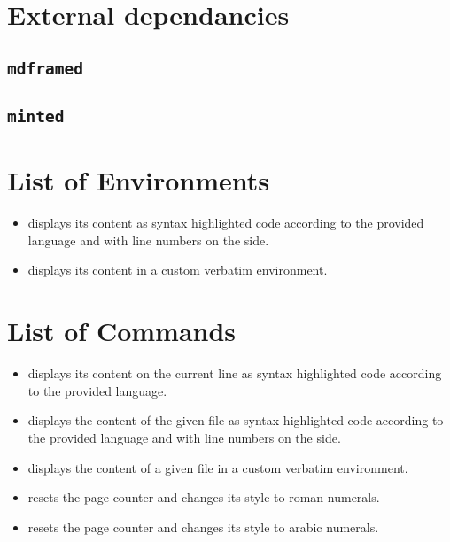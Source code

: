 \documentclass{report}
\begin{document}
\section{External dependancies}



\subsection{\texttt{mdframed}}

\subsection{\texttt{minted}}


\section{List of Environments}
\begin{itemize}
    \item {} displays its content as syntax highlighted code according to the provided language and with line numbers on the side. 
    \item {} displays its content in a custom verbatim environment.
\end{itemize}


\section{List of Commands}
\begin{itemize}
    \item {} displays its content on the current line as syntax highlighted code according to the provided language.
    \item {} displays the content of the given file as syntax highlighted code according to the provided language and with line numbers on the side.
    \item {} displays the content of a given file in a custom verbatim environment.
    \item {} resets the page counter and changes its style to roman numerals.
    \item {} resets the page counter and changes its style to arabic numerals.
\end{itemize}
\end{document}

